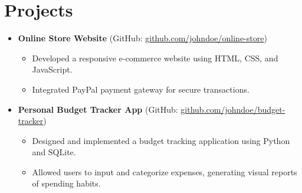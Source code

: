 \documentclass[a4paper,10pt]{article}
\begin{document}
\section*{Projects}
\begin{itemize}[leftmargin=*]
    \item \textbf{Online Store Website} (GitHub: \href{https://github.com/johndoe/online-store}{github.com/johndoe/online-store})
    \begin{itemize}
        \item Developed a responsive e-commerce website using HTML, CSS, and JavaScript.
        \item Integrated PayPal payment gateway for secure transactions.
    \end{itemize}
    
    \item \textbf{Personal Budget Tracker App} (GitHub: \href{https://github.com/johndoe/budget-tracker}{github.com/johndoe/budget-tracker})
    \begin{itemize}
        \item Designed and implemented a budget tracking application using Python and SQLite.
        \item Allowed users to input and categorize expenses, generating visual reports of spending habits.
    \end{itemize}
\end{itemize}
\end{document}
